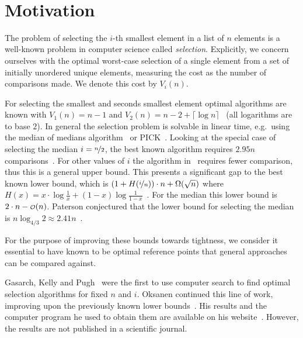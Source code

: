 \documentclass[twoside,leqno,twocolumn]{article}
\newcommand\smallO{
\mathchoice
{{\scriptstyle\mathcal{O}}}%
{{\scriptstyle\mathcal{O}}}%
{{\scriptscriptstyle\mathcal{O}}}%
{\scalebox{.50}{$\scriptscriptstyle\mathcal{O}$}}%
}
\begin{document}
\newpage~
\newpage

\section{Motivation} \label{sec:motivation}

The problem of selecting the $i$-th smallest element in a list of $n$ elements is a well-known problem in computer science called \textit{selection}.
Explicitly, we concern ourselves with the optimal worst-case selection of a single element from a set of initially unordered unique elements, measuring the cost as the number of comparisons made.
We denote this cost by $V_i(n)$.

For selecting the smallest and seconds smallest element optimal algorithms are known with $V_1(n) = n - 1$ and $V_2(n) = n - 2 + \lceil \log n\rceil$~\cite{Knuth1973} (all logarithms are to base $2$).
In general the selection problem is solvable in linear time, e.g.\ using the median of medians algorithm~\cite{Schoening1993} or PICK~\cite{Blum1972}.
Looking at the special case of selecting the median $i = \nicefrac{n}{2}$, the best known algorithm requires $2.95n$ comparisons~\cite{dor1999selecting}.
For other values of $i$ the algorithm in~\cite{dor1999selecting} requires fewer comparison, thus this is a general upper bound.
This presents a significant gap to the best known lower bound, which is $\left (1 + H(\nicefrac{i}{n}) \right ) \cdot n + \Omega(\sqrt n)$ where $H(x) = x \cdot \log \frac{1}{x} + (1 - x) \log \frac{1}{1 - x}$~\cite{bent1985finding}.
For the median this lower bound is $2 \cdot n - \smallO(n)$.
Paterson conjectured that the lower bound for selecting the median is $n \log_{4/3} 2 \approx 2.41n$~\cite{paterson1996progress}.

For the purpose of improving these bounds towards tightness, we consider it essential to have known to be optimal reference points that general approaches can be compared against.

Gasarch, Kelly and Pugh~\cite{Gasarch1996} were the first to use computer search to find optimal selection algorithms for fixed $n$ and $i$.
Oksanen continued this line of work, improving upon the previously known lower bounds~\cite{Oksanen2006}.
His results and the computer program he used to obtain them are available on his website~\cite{Oksanen}.
However, the results are not published in a scientific journal.%
\end{document}
